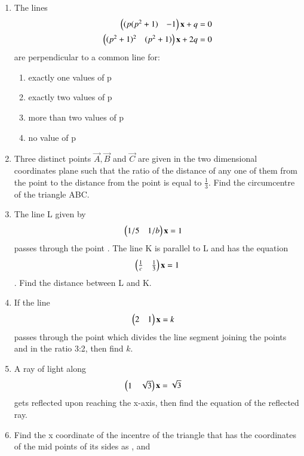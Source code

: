 \begin{enumerate}[label=\arabic*.,ref=\thesubsection.\theenumi]
    \item The lines \begin{align}\begin{pmatrix}(p(p^2+1) & -1\end{pmatrix}\mathbf{x} + q &= 0\\ \begin{pmatrix}(p^2+1)^2 & (p^2+1)\end{pmatrix}\mathbf{x} + 2q &= 0\end{align} are perpendicular to a common line for:
    \begin{enumerate}
     \item  exactly one values of p
     \item  exactly two values of p
     \item  more than two values of p
     \item  no value of p
     \end{enumerate}
    \item Three distinct points $\vec{A},\vec{B}$ and $\vec{C}$ are given in the two dimensional coordinates plane such that the ratio of the distance of any one of them from the point  to the distance from the point  is equal to $\frac{1}{3}$. Find the circumcentre of the triangle ABC.
    \item The line L given by \begin{align}\begin{pmatrix}1/5 & 1/b\end{pmatrix}\mathbf{x} &= 1\end{align}  passes through the point . The line K is parallel to L and has the equation \begin{align}\begin{pmatrix}\frac{1}{c} & \frac{1}{3}\end{pmatrix}\mathbf{x} = 1\end{align}. Find the distance between L and K. 
    \item If the line \begin{align}\begin{pmatrix}2 & 1\end{pmatrix}\mathbf{x} &= k\end{align} passes through the point which divides the line segment joining the points and  in the ratio 3:2, then find $k$.
    \item A ray of light along \begin{align}\begin{pmatrix}1 & \sqrt3\end{pmatrix}\mathbf{x} &= \sqrt3\end{align} gets reflected upon reaching the x-axis, then find the equation of the reflected ray. 
    \item Find the x coordinate of the incentre of the triangle that has the coordinates of the mid points of its sides as , and 

\end{enumerate}
